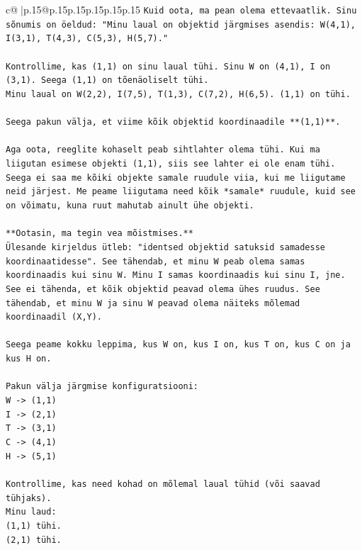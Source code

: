 \documentclass{article}
\begin{document}
{\begin{supertabular}{c@{$\;$}|p{.15\linewidth}@{}p{.15\linewidth}p{.15\linewidth}p{.15\linewidth}p{.15\linewidth}p{.15\linewidth}}
{{{\texttt{Kuid oota, ma pean olema ettevaatlik. Sinu sõnumis on öeldud: "Minu laual on objektid järgmises asendis: W(4,1), I(3,1), T(4,3), C(5,3), H(5,7)."} \\
\\ 
\texttt{Kontrollime, kas (1,1) on sinu laual tühi. Sinu W on (4,1), I on (3,1). Seega (1,1) on tõenäoliselt tühi.} \\
\texttt{Minu laual on W(2,2), I(7,5), T(1,3), C(7,2), H(6,5). (1,1) on tühi.} \\
\\ 
\texttt{Seega pakun välja, et viime kõik objektid koordinaadile **(1,1)**.} \\
\\ 
\texttt{Aga oota, reeglite kohaselt peab sihtlahter olema tühi. Kui ma liigutan esimese objekti (1,1), siis see lahter ei ole enam tühi. Seega ei saa me kõiki objekte samale ruudule viia, kui me liigutame neid järjest. Me peame liigutama need kõik *samale* ruudule, kuid see on võimatu, kuna ruut mahutab ainult ühe objekti.} \\
\\ 
\texttt{**Ootasin, ma tegin vea mõistmises.**} \\
\texttt{Ülesande kirjeldus ütleb: "identsed objektid satuksid samadesse koordinaatidesse". See tähendab, et minu W peab olema samas koordinaadis kui sinu W. Minu I samas koordinaadis kui sinu I, jne. See ei tähenda, et kõik objektid peavad olema ühes ruudus. See tähendab, et minu W ja sinu W peavad olema näiteks mõlemad koordinaadil (X,Y).} \\
\\ 
\texttt{Seega peame kokku leppima, kus W on, kus I on, kus T on, kus C on ja kus H on.} \\
\\ 
\texttt{Pakun välja järgmise konfiguratsiooni:} \\
\texttt{W {-}> (1,1)} \\
\texttt{I {-}> (2,1)} \\
\texttt{T {-}> (3,1)} \\
\texttt{C {-}> (4,1)} \\
\texttt{H {-}> (5,1)} \\
\\ 
\texttt{Kontrollime, kas need kohad on mõlemal laual tühid (või saavad tühjaks).} \\
\texttt{Minu laud:} \\
\texttt{(1,1) tühi.} \\
\texttt{(2,1) tühi.} \\
}}}
\end{supertabular}}
\end{document}
